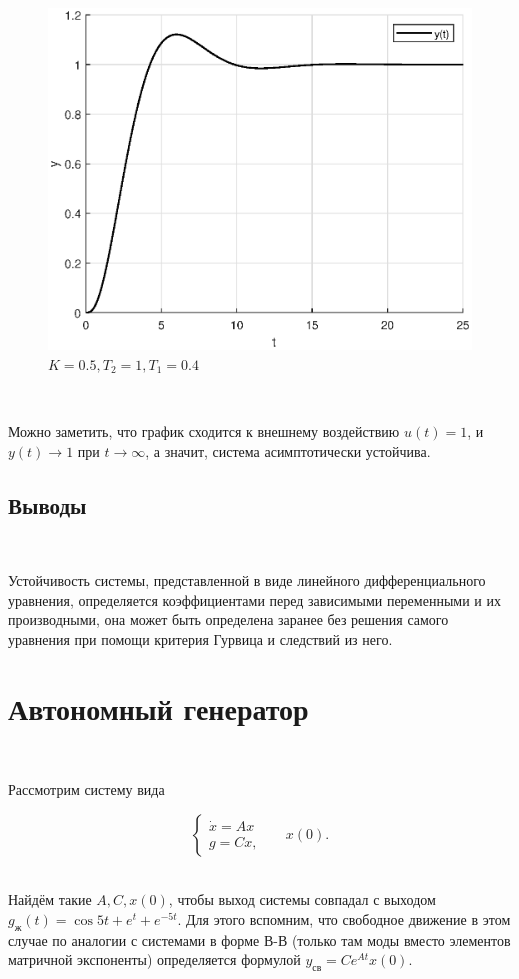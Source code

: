 \documentclass[a4paper]{article}
\begin{document}
\begin{figure}[H]
    \centering
    \includegraphics[width=0.75\linewidth]{ex2/0.5.eps}
    \caption{$K = 0.5, T_2 = 1, T_1 = 0.4$}
\end{figure}\

Можно заметить, что график сходится к внешнему воздействию $u(t) = 1$, и $y(t) \to 1$ при $t \to \infty$, а значит, система асимптотически устойчива.

\subsection{Выводы}\

Устойчивость системы, представленной в виде линейного дифференциального уравнения, определяется коэффициентами перед зависимыми переменными и их производными, она может быть определена заранее без решения самого уравнения при помощи критерия Гурвица и следствий из него.

\section{Автономный генератор}\

Рассмотрим систему вида 

$$
\begin{cases}
    \dot{x} = Ax \\
    g = Cx,
\end{cases} \ \ \ \ \ \ \ x(0).
$$\ 

Найдём такие $A, C, x(0)$, чтобы выход системы совпадал с выходом $g_{\text{ж}}(t) = \cos{5t} + e^{t} + e^{-5t}$. Для этого вспомним, что свободное движение в этом случае по аналогии с системами в форме В-В (только там моды вместо элементов матричной экспоненты) определяется формулой $y_{\text{св}} = C e^{At}x(0)$.\ 
\end{document}

